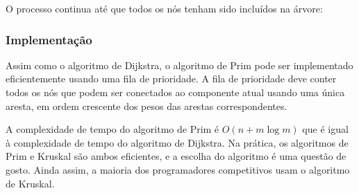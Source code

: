 \begin{samepage}
O processo continua até que todos os nós tenham sido incluídos na árvore:
\begin{center}
\end{center}
\end{samepage}

\subsubsection{Implementação}

Assim como o algoritmo de Dijkstra, o algoritmo de Prim pode ser
implementado eficientemente usando uma fila de prioridade.
A fila de prioridade deve conter todos os nós
que podem ser conectados ao componente atual usando
uma única aresta, em ordem crescente dos pesos
das arestas correspondentes.

A complexidade de tempo do algoritmo de Prim é
$O(n + m \log m)$ que é igual à complexidade de tempo
do algoritmo de Dijkstra.
Na prática, os algoritmos de Prim e Kruskal
são ambos eficientes, e a escolha do algoritmo
é uma questão de gosto.
Ainda assim, a maioria dos programadores competitivos usam o algoritmo de Kruskal.
